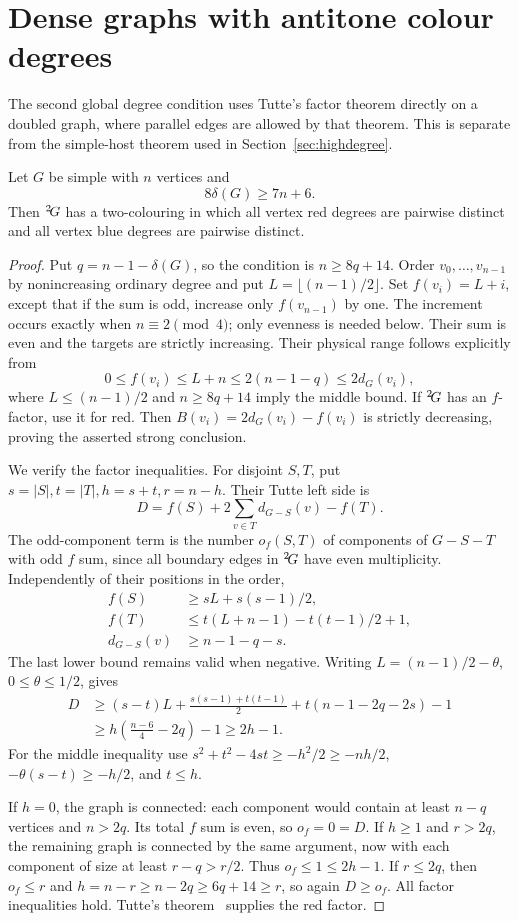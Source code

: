 \section{Dense graphs with antitone colour degrees}\label{sec:dense}

The second global degree condition uses Tutte's factor theorem directly
on a doubled graph, where parallel edges are allowed by that theorem.
This is separate from the simple-host theorem used in
Section~\ref{sec:highdegree}.

\begin{theorem}[D3]\label{thm:dense}
Let $G$ be simple with $n$ vertices and
\[
 8\delta(G)\ge7n+6.
\]
Then ${}^{2}\!G$ has a two-colouring in which all vertex red degrees
are pairwise distinct and all vertex blue degrees are pairwise distinct.
\end{theorem}
\begin{proof}
Put $q=n-1-\delta(G)$, so the condition is $n\ge8q+14$.
Order $v_0,\ldots,v_{n-1}$ by nonincreasing ordinary degree and put
$L=\lfloor(n-1)/2\rfloor$. Set $f(v_i)=L+i$, except that if the
sum is odd, increase only $f(v_{n-1})$ by one. The increment occurs
exactly when $n\equiv2\pmod4$; only evenness is needed below.
Their sum is even and the targets are strictly increasing. Their
physical range follows explicitly from
\[
 0\le f(v_i)\le L+n\le2(n-1-q)\le2d_G(v_i),
\]
where $L\le(n-1)/2$ and $n\ge8q+14$ imply the middle bound.
If ${}^{2}\!G$ has an $f$-factor, use it for red.
Then $B(v_i)=2d_G(v_i)-f(v_i)$ is strictly decreasing, proving the
asserted strong conclusion.

We verify the factor inequalities. For disjoint $S,T$, put
$s=|S|,t=|T|,h=s+t,r=n-h$. Their Tutte left side is
\[
 D=f(S)+2\sum_{v\in T}d_{G-S}(v)-f(T).
\]
The odd-component term is the number $o_f(S,T)$ of components of
$G-S-T$ with odd $f$ sum, since all boundary edges in ${}^{2}\!G$
have even multiplicity. Independently of their positions in the order,
\begin{align*}
 f(S)&\ge sL+s(s-1)/2,\\
 f(T)&\le t(L+n-1)-t(t-1)/2+1,\\
 d_{G-S}(v)&\ge n-1-q-s.
\end{align*}
The last lower bound remains valid when negative. Writing
$L=(n-1)/2-\theta$, $0\le\theta\le1/2$, gives
\begin{align*}
 D&\ge (s-t)L+\frac{s(s-1)+t(t-1)}2
       +t(n-1-2q-2s)-1\\
  &\ge h\left(\frac{n-6}{4}-2q\right)-1
   \ge2h-1.
\end{align*}
For the middle inequality use
$s^2+t^2-4st\ge-h^2/2\ge-nh/2$,
$-\theta(s-t)\ge-h/2$, and $t\le h$.

If $h=0$, the graph is connected: each component would contain at
least $n-q$ vertices and $n>2q$. Its total $f$ sum is even, so
$o_f=0=D$. If $h\ge1$ and $r>2q$, the remaining graph is connected
by the same argument, now with each component of size at least
$r-q>r/2$. Thus $o_f\le1\le2h-1$. If $r\le2q$, then $o_f\le r$
and $h=n-r\ge n-2q\ge6q+14\ge r$, so again $D\ge o_f$.
All factor inequalities hold. Tutte's theorem~\cite{Tutte54} supplies
the red factor.
\end{proof}

